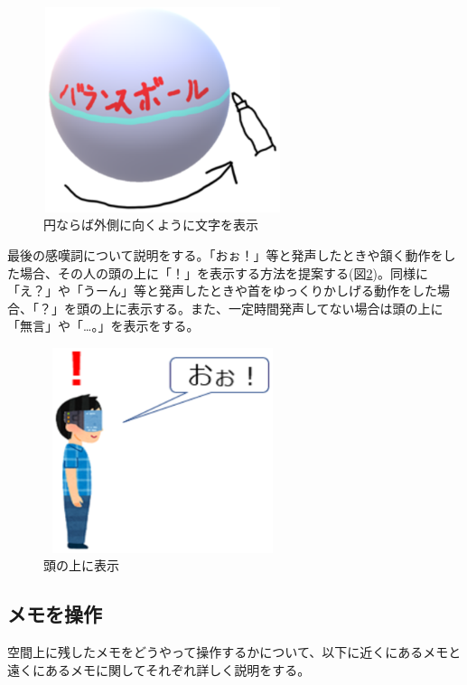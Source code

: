 \documentclass[11pt,a4j, titlepage]{jarticle} %
\begin{document}
\begin{figure}[H]
  \begin{center}
    \includegraphics[clip,height=6.0cm,width=7.0cm]{./moji_seiteki.eps}
    \caption{円ならば外側に向くように文字を表示}
    \label{fig:moji_seiteki}
  \end{center}
\end{figure}

最後の感嘆詞について説明をする。「おぉ！」等と発声したときや頷く動作をした場合、その人の頭の上に「！」を表示する方法を提案する(図\ref{fig:kantanshi})。同様に「え？」や「うーん」等と発声したときや首をゆっくりかしげる動作をした場合、「？」を頭の上に表示する。また、一定時間発声してない場合は頭の上に「無言」や「…。」を表示をする。

\begin{figure}[H]
  \begin{center}
    \includegraphics[clip,height=6.0cm,width=7.0cm]{./kantanshi.eps}
    \caption{頭の上に表示}
    \label{fig:kantanshi}
  \end{center}
\end{figure}

\subsection{メモを操作}
空間上に残したメモをどうやって操作するかについて、以下に近くにあるメモと遠くにあるメモに関してそれぞれ詳しく説明をする。
\end{document}
